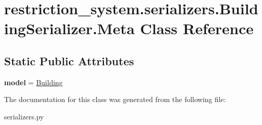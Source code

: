 \hypertarget{classrestriction__system_1_1serializers_1_1BuildingSerializer_1_1Meta}{}\section{restriction\+\_\+system.\+serializers.\+Building\+Serializer.\+Meta Class Reference}
\label{classrestriction__system_1_1serializers_1_1BuildingSerializer_1_1Meta}
\subsection*{Static Public Attributes}
\begin{DoxyCompactItemize}
\item 
\hypertarget{classrestriction__system_1_1serializers_1_1BuildingSerializer_1_1Meta_ae94cb4beb2e65c95d56bd0ff915ebc6a}{}{\bfseries model} = \hyperlink{classrestriction__system_1_1models_1_1Building}{Building}\label{classrestriction__system_1_1serializers_1_1BuildingSerializer_1_1Meta_ae94cb4beb2e65c95d56bd0ff915ebc6a}

\end{DoxyCompactItemize}


The documentation for this class was generated from the following file\+:\begin{DoxyCompactItemize}
\item 
serializers.\+py\end{DoxyCompactItemize}
